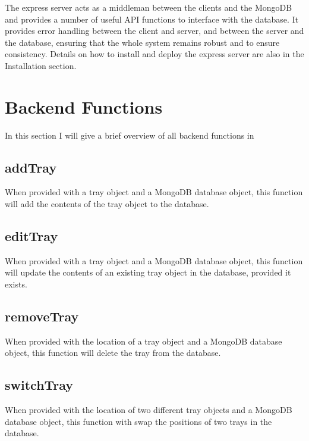 \documentclass[letterpaper,10pt,english]{sphinxmanual}
\begin{document}
The express server acts as a middle\sphinxhyphen{}man between the clients and the
MongoDB and provides a number of useful API functions to interface with
the database. It provides error handling between the client and server,
and between the server and the database, ensuring that the whole system
remains robust and to ensure consistency. Details on how to install and
deploy the express server are also in the Installation section.


\section{Back\sphinxhyphen{}end Functions}
\label{\detokenize{docs/Introduction/Backend_overview:back-end-functions}}
In this section I will give a brief overview of all back\sphinxhyphen{}end functions
in 


\subsection{addTray}
\label{\detokenize{docs/Introduction/Backend_overview:addtray}}
When provided with a tray object and a MongoDB database object, this
function will add the contents of the tray object to the database.


\subsection{editTray}
\label{\detokenize{docs/Introduction/Backend_overview:edittray}}
When provided with a tray object and a MongoDB database object, this
function will update the contents of an existing tray object in the
database, provided it exists.


\subsection{removeTray}
\label{\detokenize{docs/Introduction/Backend_overview:removetray}}
When provided with the location of a tray object and a MongoDB database
object, this function will delete the tray from the database.


\subsection{switchTray}
\label{\detokenize{docs/Introduction/Backend_overview:switchtray}}
When provided with the location of two different tray objects and a
MongoDB database object, this function with swap the positions of two
trays in the database.
\end{document}

